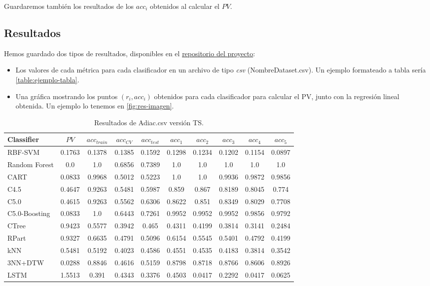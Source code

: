 Guardaremos también los resultados de los $acc_i$ obtenidos al calcular el $PV$.

\subsection{Resultados}

Hemos guardado dos tipos de resultados, disponibles en el \href{https://github.com/MiguelLentisco/tfg}{repositorio del proyecto}:

\begin{itemize}
  \item Los valores de cada métrica para cada clasificador en un archivo de tipo \emph{csv} (NombreDataset.csv). Un ejemplo formateado a tabla sería \autoref{table:ejemplo-tabla}.
  \item Una gráfica mostrando los puntos ${(r_i, acc_i)}$ obtenidos para cada clasificador para calcular el PV, junto con la regresión lineal obtenida. Un ejemplo lo tenemos en \autoref{fig:res-imagen}.
\end{itemize}

\begin{table}[htbp]
\centering
\hspace*{-0.9cm}
\begin{tabular}{||l | c c c c c c c c c||}
 \hline
 Classifier & $PV$ & $acc_{train}$ & $acc_{CV}$ & $acc_{test}$ & $acc_1$ & $acc_2$ & $acc_3$ & $acc_4$ & $acc_5$ \\ [0.5ex]
 \hline\hline
 RBF-SVM & 0.1763 & 0.1378 & 0.1385 & 0.1592 & 0.1298 & 0.1234 & 0.1202 & 0.1154 & 0.0897 \\
 Random Forest &0.0 & 1.0 & 0.6856 & 0.7389 & 1.0 & 1.0 & 1.0 & 1.0 & 1.0 \\
 CART & 0.0833 & 0.9968 & 0.5012 & 0.5223 & 1.0 & 1.0 & 0.9936 & 0.9872 & 0.9856 \\
 C4.5 & 0.4647 & 0.9263 & 0.5481 & 0.5987 & 0.859 & 0.867 & 0.8189 & 0.8045 & 0.774 \\
 C5.0 & 0.4615 & 0.9263 & 0.5562 & 0.6306 & 0.8622 & 0.851 & 0.8349 & 0.8029 & 0.7708 \\
 C5.0-Boosting & 0.0833 & 1.0 & 0.6443 & 0.7261 & 0.9952 & 0.9952 & 0.9952 & 0.9856 & 0.9792 \\
 CTree & 0.9423 & 0.5577 & 0.3942 & 0.465 & 0.4311 & 0.4199 & 0.3814 & 0.3141 & 0.2484 \\
 RPart & 0.9327 & 0.6635 & 0.4791 & 0.5096 & 0.6154 & 0.5545 & 0.5401 & 0.4792 & 0.4199 \\
 kNN & 0.5481 & 0.5192 & 0.4023 & 0.4586 & 0.4551 & 0.4535 & 0.4183 & 0.3814 & 0.3542 \\
 3NN+DTW & 0.0288 & 0.8846 & 0.4616 & 0.5159 & 0.8798 & 0.8718 & 0.8766 & 0.8606 & 0.8926 \\
 LSTM & 1.5513 & 0.391 & 0.4343 & 0.3376 & 0.4503 & 0.0417 & 0.2292 & 0.0417 & 0.0625 \\ [1ex]
 \hline
\end{tabular}
\caption{Resultados de Adiac.csv versión TS.}
\label{table:ejemplo-tabla}
\end{table}

